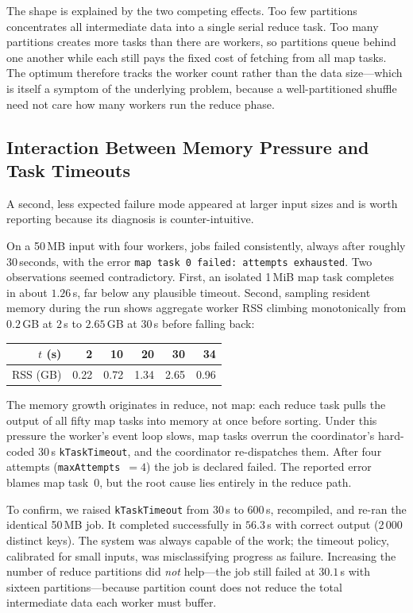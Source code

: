 \documentclass[conference]{IEEEtran}
\begin{document}
The shape is explained by the two competing effects. Too few partitions
concentrates all intermediate data into a single serial reduce task. Too
many partitions creates more tasks than there are workers, so partitions
queue behind one another while each still pays the fixed cost of fetching
from all map tasks. The optimum therefore tracks the worker count rather
than the data size---which is itself a symptom of the underlying problem,
because a well-partitioned shuffle need not care how many workers run the
reduce phase.

\subsection{Interaction Between Memory Pressure and Task Timeouts}

A second, less expected failure mode appeared at larger input sizes and is
worth reporting because its diagnosis is counter-intuitive.

On a 50\,MB input with four workers, jobs failed consistently, always after
roughly $30$\,seconds, with the error \texttt{map task 0 failed: attempts
exhausted}. Two observations seemed contradictory. First, an isolated 1\,MiB
map task completes in about $1.26$\,s, far below any plausible timeout.
Second, sampling resident memory during the run shows aggregate worker RSS
climbing monotonically from $0.2$\,GB at $2$\,s to $2.65$\,GB at $30$\,s
before falling back:

\begin{center}
\begin{tabular}{@{}rrrrrr@{}}
\toprule
$t$ (s) & 2 & 10 & 20 & 30 & 34 \\
\midrule
RSS (GB) & 0.22 & 0.72 & 1.34 & 2.65 & 0.96 \\
\bottomrule
\end{tabular}
\end{center}

The memory growth originates in reduce, not map: each reduce task pulls the
output of all fifty map tasks into memory at once before sorting. Under this
pressure the worker's event loop slows, map tasks overrun the coordinator's
hard-coded $30$\,s \texttt{kTaskTimeout}, and the coordinator re-dispatches
them. After four attempts (\texttt{maxAttempts}~$=4$) the job is declared
failed. The reported error blames map task~0, but the root cause lies
entirely in the reduce path.

To confirm, we raised \texttt{kTaskTimeout} from $30$\,s to $600$\,s,
recompiled, and re-ran the identical 50\,MB job. It completed successfully
in $56.3$\,s with correct output (2\,000 distinct keys). The system was
always capable of the work; the timeout policy, calibrated for small inputs,
was misclassifying progress as failure. Increasing the number of reduce
partitions did \emph{not} help---the job still failed at $30.1$\,s with
sixteen partitions---because partition count does not reduce the total
intermediate data each worker must buffer.
\end{document}
